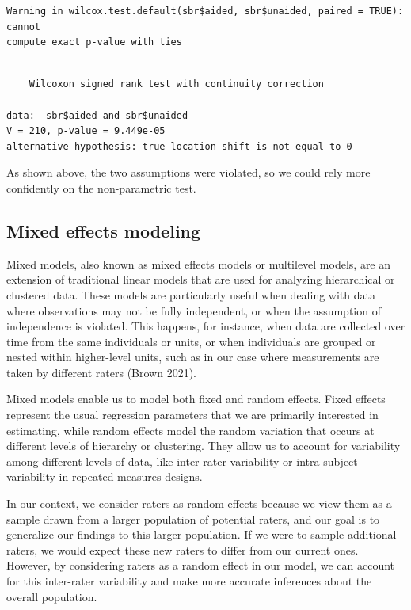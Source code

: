 \documentclass[
  letterpaper,
  DIV=11,
  numbers=noendperiod]{scrreprt}
\begin{document}
\begin{verbatim}
Warning in wilcox.test.default(sbr$aided, sbr$unaided, paired = TRUE): cannot
compute exact p-value with ties
\end{verbatim}

\begin{verbatim}

    Wilcoxon signed rank test with continuity correction

data:  sbr$aided and sbr$unaided
V = 210, p-value = 9.449e-05
alternative hypothesis: true location shift is not equal to 0
\end{verbatim}

As shown above, the two assumptions were violated, so we could rely more
confidently on the non-parametric test.

\hypertarget{mixed-effects-modeling}{%
\subsection{Mixed effects modeling}\label{mixed-effects-modeling}}

Mixed models, also known as mixed effects models or multilevel models,
are an extension of traditional linear models that are used for
analyzing hierarchical or clustered data. These models are particularly
useful when dealing with data where observations may not be fully
independent, or when the assumption of independence is violated. This
happens, for instance, when data are collected over time from the same
individuals or units, or when individuals are grouped or nested within
higher-level units, such as in our case where measurements are taken by
different raters (Brown 2021).

Mixed models enable us to model both fixed and random effects. Fixed
effects represent the usual regression parameters that we are primarily
interested in estimating, while random effects model the random
variation that occurs at different levels of hierarchy or clustering.
They allow us to account for variability among different levels of data,
like inter-rater variability or intra-subject variability in repeated
measures designs.

In our context, we consider raters as random effects because we view
them as a sample drawn from a larger population of potential raters, and
our goal is to generalize our findings to this larger population. If we
were to sample additional raters, we would expect these new raters to
differ from our current ones. However, by considering raters as a random
effect in our model, we can account for this inter-rater variability and
make more accurate inferences about the overall population.
\end{document}
